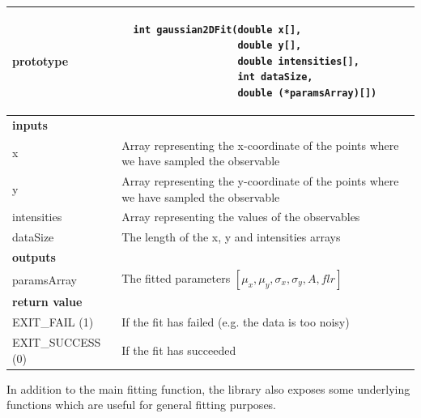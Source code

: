 \documentclass{article}
\begin{document}
\begin{center}
\begin{tabular}{|l|p{}|}
  \hline
  \textbf{prototype} & \begin{lstlisting} 
  int gaussian2DFit(double x[], 
					double y[], 
					double intensities[], 
					int dataSize, 
					double (*paramsArray)[])
  \end{lstlisting} \\
  \hline
  \multicolumn{2}{l}{\textbf{inputs}} \\
  \hline
  x & Array representing the x-coordinate of the points where we have sampled the observable \\
  \hline
  y & Array representing the y-coordinate of the points where we have sampled the observable \\
  \hline
  intensities & Array representing the values of the observables \\
  \hline
  dataSize & The length of the x, y and intensities arrays \\
  \hline
  \multicolumn{2}{l}{\textbf{outputs}} \\
  \hline
  paramsArray & The fitted parameters $[\mu_x, \mu_y, \sigma_x, \sigma_y, A, flr]$ \\
  \hline
  \multicolumn{2}{l}{\textbf{return value}} \\
  \hline
  EXIT\_FAIL (1) & If the fit has failed (e.g. the data is too noisy) \\
  \hline
  EXIT\_SUCCESS (0) & If the fit has succeeded \\
  \hline
\end{tabular}
\end{center}

In addition to the main fitting function, the library also exposes some underlying functions which are useful for general fitting purposes. 
\end{document}
